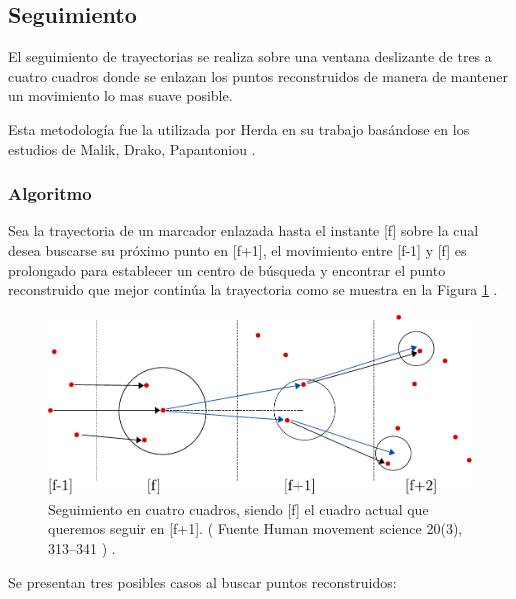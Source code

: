 \subsection{Seguimiento}

El seguimiento de trayectorias se realiza sobre una ventana deslizante de tres a cuatro cuadros donde se enlazan los puntos reconstruidos de manera de mantener un movimiento lo mas suave posible.

Esta metodología fue la utilizada por Herda \cite{herda} en su trabajo basándose en los estudios de Malik, Drako, Papantoniou \cite{griegos} .

\subsubsection{Algoritmo}

Sea la trayectoria de un marcador enlazada hasta el instante [f] sobre la cual desea buscarse su próximo punto en [f+1], el movimiento entre [f-1] y [f] es prolongado para establecer un centro de búsqueda y encontrar el punto reconstruido que mejor continúa la trayectoria como se muestra en la Figura \ref{herda_00} .

\begin{figure}[ht!]
\begin{center}
\includegraphics[scale=0.4]{imagenes/Seguimiento/tracking-eps-converted-to.pdf}
\end{center}
\caption{Seguimiento en cuatro cuadros, siendo [f] el cuadro actual que queremos seguir en [f+1]. ( Fuente  Human movement
science 20(3), 313–341 \cite{herda} ) .}
\label{herda_00}
\end{figure}

Se presentan tres posibles casos al buscar puntos reconstruidos:

